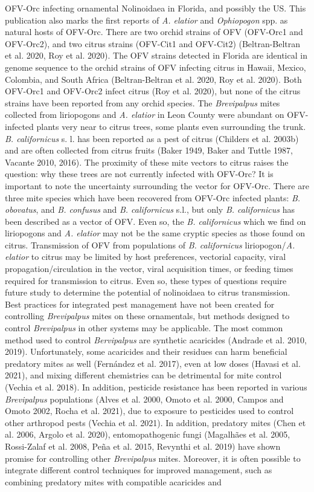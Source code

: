 \documentclass[12pt,final,CPage]{ufthesis}
\begin{document}
{OFV-Orc infecting ornamental Nolinoidaea in Florida, and possibly the US. This publication also marks the first reports of \emph{A. elatior} and \emph{Ophiopogon} spp. as natural hosts of OFV-Orc. There are two orchid strains of OFV (OFV-Orc1 and OFV-Orc2), and two citrus strains (OFV-Cit1 and OFV-Cit2) (Beltran-Beltran et al. 2020, Roy et al. 2020). The OFV strains detected in Florida are identical in genome sequence to the orchid strains of OFV infecting citrus in Hawaii, Mexico, Colombia, and South Africa (Beltran-Beltran et al. 2020, Roy et al. 2020). Both OFV-Orc1 and OFV-Orc2 infect citrus (Roy et al. 2020), but none of the citrus strains have been reported from any orchid species. The \emph{Brevipalpus} mites collected from liriopogons and \emph{A. elatior} in Leon County were abundant on OFV-infected plants very near to citrus trees, some plants even surrounding the trunk. \emph{B. californicus} s. l. has been reported as a pest of citrus (Childers et al. 2003b) and are often collected from citrus fruits (Baker 1949, Baker and Tuttle 1987, Vacante 2010, 2016). The proximity of these mite vectors to citrus raises the question: why these trees are not currently infected with OFV-Orc? It is important to note the uncertainty surrounding the vector for OFV-Orc. There are three mite species which have been recovered from OFV-Orc infected plants: \emph{B. obovatus}, and \emph{B. confusus} and \emph{B. californicus} s.l., but only \emph{B. californicus} has been described as a vector of OFV. Even so, the \emph{B. californicus} which we find on liriopogons and \emph{A. elatior} may not be the same cryptic species as those found on citrus. Transmission of OFV from populations of \emph{B. californicus} liriopogon/\emph{A. elatior} to citrus may be limited by host preferences, vectorial capacity, viral propagation/circulation in the vector, viral acquisition times, or feeding times required for transmission to citrus. Even so, these types of questions require future study to determine the potential of nolinoidaea to citrus transmission. Best practices for integrated pest management have not been created for controlling \emph{Brevipalpus} mites on these ornamentals, but methods designed to control \emph{Brevipalpus} in other systems may be applicable. The most common method used to control \emph{Bervipalpus} are synthetic acaricides (Andrade et al. 2010, 2019). Unfortunately, some acaricides and their residues can harm beneficial predatory mites as well (Fernández et al. 2017), even at low doses (Havasi et al. 2021), and mixing different chemistries can be detrimental for mite control (Vechia et al. 2018). In addition, pesticide resistance has been reported in various \emph{Brevipalpus} populations (Alves et al. 2000, Omoto et al. 2000, Campos and Omoto 2002, Rocha et al. 2021), due to exposure to pesticides used to control other arthropod pests (Vechia et al. 2021). In addition, predatory mites (Chen et al. 2006, Argolo et al. 2020), entomopathogenic fungi (Magalhães et al. 2005, Rossi-Zalaf et al. 2008, Peña et al. 2015, Revynthi et al. 2019) have shown promise for controlling other \emph{Brevipalpus} mites. Moreover, it is often possible to integrate different control techniques for improved management, such as combining predatory mites with compatible acaricides and }
\end{document}
